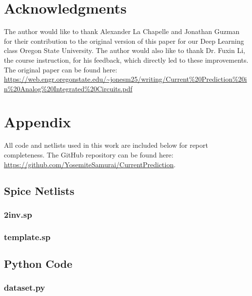 \documentclass[10pt,twocolumn,letterpaper]{article}
\begin{document}
\section*{Acknowledgments}
\label{sec:acknowledgements}

The author would like to thank Alexander La Chapelle and Jonathan Guzman for their contribution to the original version of this paper for our Deep Learning class Oregon State University.  The author would also like to thank Dr. Fuxin Li, the course instruction, for his feedback, which directly led to these improvements.  The original paper can be found here: \url{https://web.engr.oregonstate.edu/~jonesm25/writing/Current%20Prediction%20in%20Analog%20Integrated%20Circuits.pdf}




\clearpage
\appendix
\onecolumn

\section*{Appendix}
\label{sec:appendix}

All code and netlists used in this work are included below for report completeness. The GitHub repository can be found here: \url{https://github.com/YosemiteSamurai/CurrentPrediction}.

\subsection*{Spice Netlists}
\label{appendix:netlists}

\subsubsection*{2inv.sp}
\label{netlist:2inv}


\subsubsection*{template.sp}
\label{netlist:template}


\subsection*{Python Code}
\label{appendix:python}

\subsubsection*{dataset.py}
\label{code:dataset}

\end{document}
